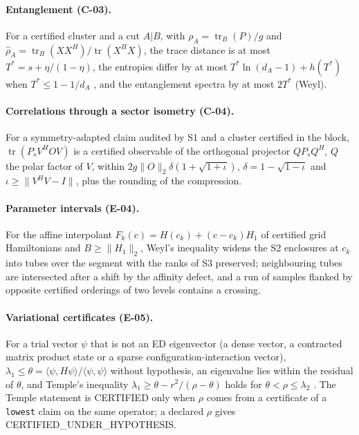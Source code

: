 \documentclass[11pt,a4paper]{article}
\newcommand{\code}[1]{\texttt{#1}}
\newcommand{\status}[1]{\textsf{#1}}
\newcommand{\CERT}{\status{CERTIFIED}}
\newcommand{\norm}[1]{\lVert #1\rVert}
\newcommand{\tr}{\operatorname{tr}}
\begin{document}
\paragraph{Entanglement (C-03).}
For a certified cluster and a cut $A|B$, with $\rho_A=\tr_B(P)/g$ and $\hat\rho_A=\tr_B(XX^H)/\tr(X^HX)$, the trace
distance is at most $T^*=s+\eta/(1-\eta)$, the entropies differ by at most $T^*\ln(d_A-1)+h(T^*)$ when $T^*\le
1-1/d_A$ \cite{Fannes1973,Audenaert2007}, and the entanglement spectra by at most $2T^*$ (Weyl).

\paragraph{Correlations through a sector isometry (C-04).}
For a symmetry-adapted claim audited by S1 and a cluster certified in the block, $\tr(P_sV^HOV)$ is a certified
observable of the orthogonal projector $QP_sQ^H$, $Q$ the polar factor of $V$, within
$2g\norm{O}_2\delta(1+\sqrt{1+\iota})$, $\delta=1-\sqrt{1-\iota}$ and $\iota\ge\norm{V^HV-I}$, plus the rounding of the
compression.

\paragraph{Parameter intervals (E-04).}
For the affine interpolant $F_k(c)=H(c_k)+(c-c_k)H_1$ of certified grid Hamiltonians and $B\ge\norm{H_1}_2$, Weyl's
inequality widens the S2 enclosures at $c_k$ into tubes over the segment with the ranks of S3 preserved; neighbouring
tubes are intersected after a shift by the affinity defect, and a run of samples flanked by opposite certified
orderings of two levels contains a crossing.

\paragraph{Variational certificates (E-05).}
For a trial vector $\psi$ that is not an ED eigenvector (a dense vector, a contracted matrix product state or a sparse
configuration-interaction vector), $\lambda_1\le\theta=\langle\psi,H\psi\rangle/\langle\psi,\psi\rangle$ without
hypothesis, an eigenvalue lies within the residual of $\theta$, and Temple's inequality
$\lambda_1\ge\theta-r^2/(\rho-\theta)$ holds for $\theta<\rho\le\lambda_2$ \cite{Temple1928}. The Temple statement is
\CERT{} only when $\rho$ comes from a certificate of a \code{lowest} claim on the same operator; a declared $\rho$ gives
\status{CERTIFIED\_UNDER\_HYPOTHESIS}.
\end{document}
